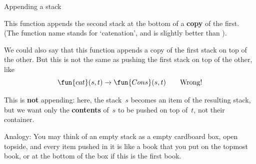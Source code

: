 %
\begin{frame}{Appending a stack}

  This function appends the second stack at the bottom of a
  \textbf{copy} of the first. (The function name  stands
  for `catenation', and is slightly better than ).

  \bigskip

  We could also say that this function appends a copy of the first
  stack on top of the other. But this is not the same as pushing the
  first stack on top of the other, like
  \begin{equation*}
    \fun{cat}(s,t) \rightarrow \fun{Cons}(s,t) \qquad
    \text{Wrong!}
  \end{equation*}

  This is \textbf{not} appending: here, the stack~\(s\) becomes an
  item of the resulting stack, but we want only the \textbf{contents}
  of~\(s\) to be pushed on top of~\(t\), not their container.

  \bigskip

  Analogy: You may think of an empty stack as a empty cardboard box,
  open topside, and every item pushed in it is like a book that you
  put on the topmost book, or at the bottom of the box if this is the
  first book.

\end{frame}

